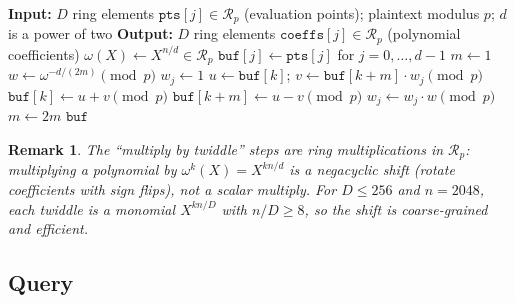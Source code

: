 \documentclass[11pt,a4paper]{article}
\newcommand{\R}{\mathcal{R}}
\newcommand{\Rp}{\R_{p}}
\newtheorem{remark}{Remark}
\begin{document}
\begin{algorithm}[H]
\caption{$\textsc{InverseDFT}(\texttt{pts}[0\mathinner{.\,.}D\!-\!1], p)$: Cooley--Tukey inverse DFT over $\Rp$.}
\label{alg:inversedft}
\begin{algorithmic}[1]
\State \textbf{Input:} $D$ ring elements $\texttt{pts}[j] \in \Rp$ (evaluation points); plaintext modulus $p$; $d$ is a power of two
\State \textbf{Output:} $D$ ring elements $\texttt{coeffs}[j] \in \Rp$ (polynomial coefficients)
\State $\omega(X) \gets X^{n/d} \in \Rp$ 
\State $\texttt{buf}[j] \gets \texttt{pts}[j]$ for $j = 0, \ldots, d-1$ 
\Statex
\State {}
\State $m \gets 1$ 
    \State $w \gets \omega^{-d/(2m)} \pmod{p}$ 
    \State $w_j \gets 1$
         
            \State $u \gets \texttt{buf}[k]$; \quad $v \gets \texttt{buf}[k + m] \cdot w_j \pmod{p}$ \Comment{ring multiply in $\Rp$}
            \State $\texttt{buf}[k] \gets u + v \pmod{p}$
            \State $\texttt{buf}[k + m] \gets u - v \pmod{p}$
        \EndFor
        \State $w_j \gets w_j \cdot w \pmod{p}$ 
    \EndFor
    \State $m \gets 2m$
\EndWhile
\State \Return $\texttt{buf}$ 
\end{algorithmic}
\end{algorithm}

\begin{remark}
The ``multiply by twiddle'' steps are ring multiplications in $\Rp$: multiplying a polynomial by $\omega^k(X) = X^{kn/d}$ is a negacyclic shift (rotate coefficients with sign flips), not a scalar multiply.
For $D \le 256$ and $n = 2048$, each twiddle is a monomial $X^{kn/D}$ with $n/D \ge 8$, so the shift is coarse-grained and efficient.
\end{remark}

\subsection{Query}\label{sec:query}
\end{document}
